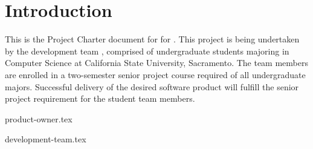 \section{Introduction}
This is the Project Charter document for {\ProjectName} for {\ClientName}. This
project is being undertaken by the development team {\TeamName}, comprised of
undergraduate students majoring in Computer Science at California State
University, Sacramento. The team members are enrolled in a two-semester senior
project course required of all undergraduate majors. Successful delivery of the
desired software product will fulfill the senior project requirement for the
student team members.

\vspace{0.5in}

{product-owner.tex}

\vspace{0.5in}

{development-team.tex}